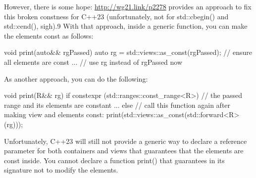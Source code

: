 However, there is some hope: \url{http://wg21.link/p2278} provides an approach to fix this broken constness for C++23 (unfortunately, not for std::cbegin() and std::cend(), sigh).9 With that approach, inside a generic function, you can make the elements const as follows:

\begin{cpp}
void print(auto&& rgPassed)
{
	auto rg = std::views::as_const(rgPassed); // ensure all elements are const
	... // use rg instead of rgPassed now
}
\end{cpp}

As another approach, you can do the following:

\begin{cpp}
void print(R&& rg)
{
	if constexpr (std::ranges::const_range<R>) {
		// the passed range and its elements are constant
		...
	}
	else {
		// call this function again after making view and elements const:
		print(std::views::as_const(std::forward<R>(rg)));
	}
}
\end{cpp}

Unfortunately, C++23 will still not provide a generic way to declare a reference parameter for both containers and views that guarantees that the elements are const inside. You cannot declare a function print() that guarantees in its signature not to modify the elements.

